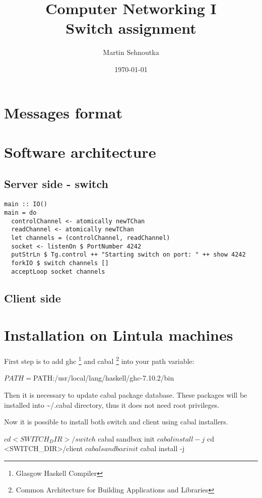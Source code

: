 \documentclass[11pt,a4paper,titlepage]{article}
\title{\blue Computer Networking I \\
\blueb Switch assignment}
\author{Martin Sehnoutka}
\date{\today}
\begin{document}
\maketitle

\tableofcontents

\section{Messages format}

\section{Software architecture}

\subsection{Server side - switch}

\begin{verbatim}
main :: IO()
main = do
  controlChannel <- atomically newTChan
  readChannel <- atomically newTChan
  let channels = (controlChannel, readChannel)
  socket <- listenOn $ PortNumber 4242
  putStrLn $ Tg.control ++ "Starting switch on port: " ++ show 4242
  forkIO $ switch channels []
  acceptLoop socket channels
\end{verbatim}

\subsection{Client side}

\section{Installation on Lintula machines}

First step is to add ghc \footnote{Glasgow Haskell Compiler} and cabal \footnote{Common Architecture for Building Applications and Libraries} into your path variable:
\begin{bashcode}
$ PATH=$PATH:/usr/local/lang/haskell/ghc-7.10.2/bin
\end{bashcode}
Then it is necessary to update cabal package database. These packages will be installed into \textasciitilde/.cabal directory, thus it does not need root privileges. 
Now it is possible to install both switch and client using cabal installers.
\begin{bashcode}
$ cd <SWITCH_DIR>/switch
$ cabal sandbox init
$ cabal install -j
$ cd <SWITCH_DIR>/client
$ cabal sandbox init
$ cabal install -j
\end{bashcode}
\end{document}
